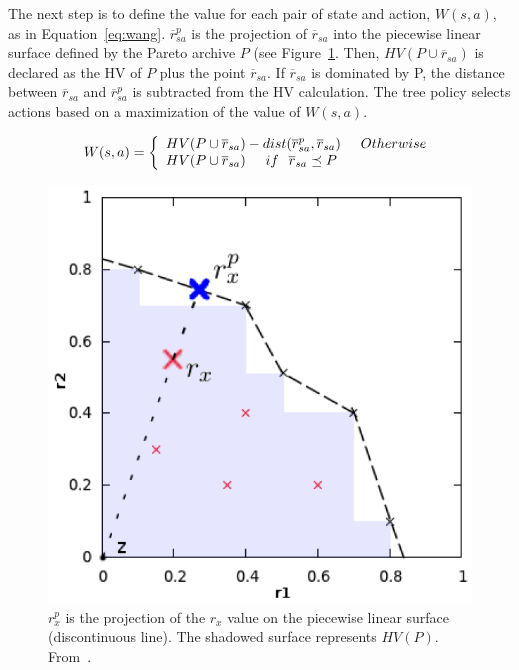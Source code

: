 \documentclass[journal]{IEEEtran}
\begin{document}
The next step is to define the value for each pair of state and action, $W(s,a)$, as in Equation~\ref{eq:wang}. $\overline{r}^p_{sa}$ is the projection of $\overline{r}_{sa}$ into the piecewise linear surface defined by the Pareto archive $P$ (see Figure~\ref{fig:wangHV}. Then, $HV(P \cup \overline{r}_{sa})$ is declared as the HV of $P$ plus the point $\overline{r}_{sa}$. If $\overline{r}_{sa}$ is dominated by P, the distance between $\overline{r}_{sa}$ and $\overline{r}^p_{sa}$ is subtracted from the HV calculation. The tree policy selects actions based on a maximization of the value of $W(s,a)$.

\begin{equation} \label{eq:wang}
	W(s,a) = \left\{
\begin{array}{l l}      
    HV(P \cup \overline{r}_{sa}) - dist(\overline{r}^p_{sa}, \overline{r}_{sa} )\hspace{0.5cm} Otherwise \\
    HV(P \cup \overline{r}_{sa}) \hspace{0.5cm} if \hspace{0.25cm} \overline{r}_{sa} \preceq P\\
\end{array}\right.
\end{equation}


\begin{figure}[!t]
\begin{center}
\includegraphics[width=0.65\columnwidth]{img/wangHV}
\end{center}
\caption{$r^p_x$ is the projection of the $r_x$ value on the piecewise linear surface (discontinuous line). The shadowed surface represents $HV(P)$. From~\cite{Weijia2012}.}
\label{fig:wangHV}
\end{figure}
 
\end{document}
